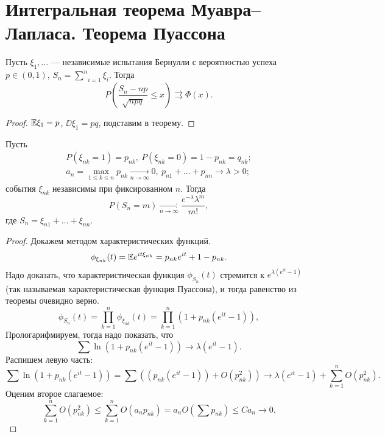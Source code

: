 \section{Интегральная теорема Муавра–Лапласа. Теорема Пуассона}

\begin{corollary} Пусть
    $\xi_1, \ldots$ --- независимые испытания Бернулли с вероятностью успеха $p\in (0, 1)$, $S_n = \underset{i = 1}{\overset{n}{\sum}} \xi_i$.
    Тогда $$P\left(\frac{S_n - np}{\sqrt{npq}}\le x\right) \rightrightarrows \Phi(x).$$
\end{corollary}

\begin{proof}
    $\mathbb{E} \xi_1 = p$, $ \DD\xi_1 = pq$, подставим в теорему.
\end{proof}

\begin{theorem}[Пуассона]
    Пусть 
    \begin{gather*}
        P(\xi_{nk} = 1) = p_{nk}, \ P(\xi_{nk} = 0) = 1- p_{nk} = q_{nk};\\
        a_n = \underset{1\le k\le n}{\max} p_{nk}\underset{n\rightarrow\infty}{\rightarrow} 0, \ p_{n1} +\ldots + p_{nn}\rightarrow \lambda > 0;
    \end{gather*}
   события $\xi_{nk}$ независимы при фиксированном $n$.
    Тогда 
    $$P(S_n = m)\underset{n\rightarrow\infty}{\rightarrow} \frac{e^{-\lambda} \lambda^m}{m!},$$
    где $S_n = \xi_{n1} + \ldots + \xi_{nn}$.
\end{theorem}

\begin{proof} Докажем методом характеристических функций.
    $$\phi_{\xi_{nk}}(t) = \mathbb{E} e^{it\xi_{nk}} = p_{nk}e^{it} + 1 - p_{nk}.$$
   Надо доказать, что характеристическая функция
    $\phi_{S_n}(t)$
    стремится к $e^{\lambda(e^{it} - 1)}$  (так называемая характеристическая функция Пуассона), и тогда равенство из теоремы очевидно верно.
     $$\phi_{S_n}(t) = \prod\limits_{k=1} ^ n \phi_{\xi_{nk}}(t) = \prod\limits_{k=1} ^ n (1+p_{nk}(e^{it} - 1)),$$
    Прологарифмируем, тогда надо показать, что
    $$\sum \ln(1+p_{nk}(e^{it} - 1)) \to \lambda (e^{it} - 1).$$
   Распишем левую часть:
    $$\sum \ln(1+p_{nk}(e^{it} - 1)) = \sum((p_{nk}(e^{it} - 1)) + O(p_{nk}^2)) \rightarrow  \lambda (e^{it} - 1) + \sum\limits_{k=1} ^ n O(p_{nk} ^ 2).$$
   Оценим второе слагаемое:
    $$\sum\limits_{k=1} ^ n O(p_{nk} ^ 2) \le \sum\limits_{k=1} ^ n O(a_np_{nk}) = a_n O\left(\sum p_{nk}\right) \le Ca_n \rightarrow 0.$$

\end{proof}\newpage
